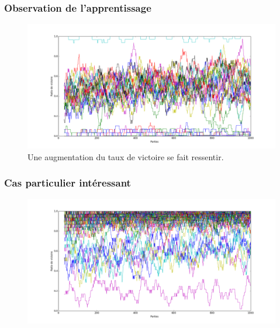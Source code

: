 \documentclass{beamer}
\begin{document}
\begin{frame}
  \frametitle{Observation de l'apprentissage}
  \begin{figure}
    \includegraphics[scale=0.265]{plot/eleve2.png}
    \caption{
      \label{fig_eleve2} Une augmentation du taux de victoire se fait ressentir.
    }
  \end{figure}
\end{frame}

\begin{frame}
  \frametitle{Cas particulier intéressant}
  \begin{figure}
    \includegraphics[scale=0.265]{plot/fake.png}
  \end{figure}
\end{frame}
\end{document}
